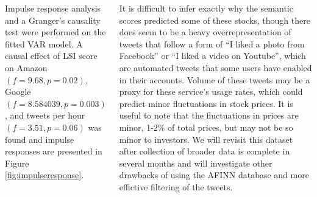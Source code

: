 \documentclass[17pt, a1paper, portrait, margin=0mm, innermargin=1mm,
     blockverticalspace=3mm, colspace=5mm, subcolspace=5mm]{tikzposter} %
\begin{document}
\begin{columns}
{   %
   Impulse response analysis and a Granger's causality test were performed on the
   fitted VAR model. 
   A causal effect of LSI score on Amazon $(f = 9.68, p = 0.02)$,
   Google $(f = 8.584039, p = 0.003)$, and tweets per hour $(f = 3.51, p =
   0.06)$ was found and impulse responses are presented in Figure
   \ref{fig:impulseresponse}. 

   It is difficult to infer exactly why the semantic scores predicted some of
   these stocks, though there does seem to be a heavy overrepresentation of
   tweets that follow a form of ``I liked a photo from Facebook'' or ``I liked
   a video on Youtube'', which are automated tweets that some users have
   enabled in their accounts. Volume of these tweets may be a proxy for
   these service's usage rates, which could predict minor fluctuations in stock
   prices. It is useful to note that the fluctuations in prices are minor,
   1-2\% of total prices, but may not be so minor to investors. We will revisit
   this dataset after collection of broader data is complete in several months
   and will investigate other drawbacks of using the AFINN database and
   more effictive filtering of the tweets.
   }


 \end{columns}
\end{document}
